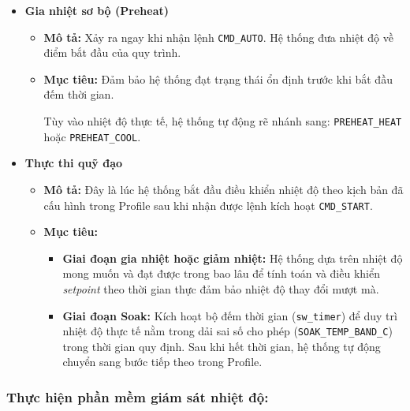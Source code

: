 \begin{itemize}

    \item \textbf{Gia nhiệt sơ bộ (Preheat)}
    
    \begin{itemize}
        \item \textbf{Mô tả:} Xảy ra ngay khi nhận lệnh \texttt{CMD\_AUTO}. Hệ thống đưa nhiệt độ về điểm bắt đầu của quy trình.
        
        \item \textbf{Mục tiêu:} Đảm bảo hệ thống đạt trạng thái ổn định trước khi bắt đầu đếm thời gian. 
        
        Tùy vào nhiệt độ thực tế, hệ thống tự động rẽ nhánh sang:
        \texttt{PREHEAT\_HEAT} hoặc \texttt{PREHEAT\_COOL}.
    \end{itemize}

    \item \textbf{Thực thi quỹ đạo}
    
    \begin{itemize}
        \item \textbf{Mô tả:} Đây là lúc hệ thống bắt đầu điều khiển nhiệt độ theo kịch bản đã cấu hình trong Profile sau khi nhận được lệnh kích hoạt \texttt{CMD\_START}.
        
        \item \textbf{Mục tiêu:}
        
        \begin{itemize}
            \item \textbf{Giai đoạn gia nhiệt hoặc giảm nhiệt:} Hệ thống dựa trên nhiệt độ mong muốn và đạt được trong bao lâu để tính toán và điều khiển \textit{setpoint} theo thời gian thực đảm bảo nhiệt độ thay đổi mượt mà.
            
            \item \textbf{Giai đoạn Soak:} Kích hoạt bộ đếm thời gian (\texttt{sw\_timer}) để duy trì nhiệt độ thực tế nằm trong dải sai số cho phép (\texttt{SOAK\_TEMP\_BAND\_C}) trong thời gian quy định. Sau khi hết thời gian, hệ thống tự động chuyển sang bước tiếp theo trong Profile.
            
        \end{itemize}
    \end{itemize}

\end{itemize}

\subsubsection{Thực hiện phần mềm giám sát nhiệt độ:}

